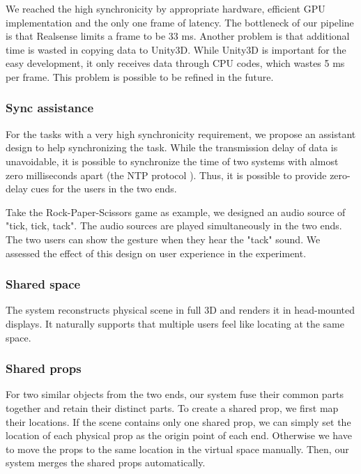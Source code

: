 We reached the high synchronicity by appropriate hardware, efficient GPU implementation and the only one frame of latency. The bottleneck of our pipeline is that Realsense limits a frame to be 33 ms. Another problem is that additional time is wasted in copying data to Unity3D. While Unity3D is important for the easy development, it only receives data through CPU codes, which wastes 5 ms per frame. This problem is possible to be refined in the future.

\subsubsection{Sync assistance}

For the tasks with a very high synchronicity requirement, we propose an assistant design to help synchronizing the task. While the transmission delay of data is unavoidable, it is possible to synchronize the time of two systems with almost zero milliseconds apart (the NTP protocol \cite{mills1991internet}). Thus, it is possible to provide zero-delay cues for the users in the two ends.

Take the Rock-Paper-Scissors game as example, we designed an audio source of "tick, tick, tack". The audio sources are played simultaneously in the two ends. The two users can show the gesture when they hear the "tack" sound. We assessed the effect of this design on user experience in the experiment.

\subsubsection{Shared space}

The system reconstructs physical scene in full 3D and renders it in head-mounted displays. It naturally supports that multiple users feel like locating at the same space.

\subsubsection{Shared props}

For two similar objects from the two ends, our system fuse their common parts together and retain their distinct parts. To create a shared prop, we first map their locations. If the scene contains only one shared prop, we can simply set the location of each physical prop as the origin point of each end. Otherwise we have to move the props to the same location in the virtual space manually. Then, our system merges the shared props automatically.


